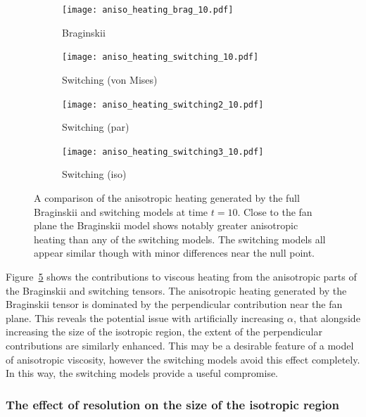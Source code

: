 \begin{figure}[t]
    \hfill
    \begin{subfigure}{0.49\textwidth}
      \texttt{[image: aniso\_heating\_brag\_10.pdf]}
      \caption{Braginskii}%
      \label{fig:aniso_heating_brag_10}
    \end{subfigure}
    \hfill
    \begin{subfigure}{0.49\textwidth}
      \texttt{[image: aniso\_heating\_switching\_10.pdf]}
      \caption{Switching (von Mises)}%
      \label{fig:aniso_heating_switching_10}
    \end{subfigure}
    \hfill
    \begin{subfigure}{0.49\textwidth}
      \texttt{[image: aniso\_heating\_switching2\_10.pdf]}
      \caption{Switching (par)}%
      \label{fig:aniso_heating_switching2_10}
    \end{subfigure}
    \hfill
    \begin{subfigure}{0.49\textwidth}
      \texttt{[image: aniso\_heating\_switching3\_10.pdf]}
      \caption{Switching (iso)}%
      \label{fig:aniso_heating_switching3_10}
    \end{subfigure}
    \caption{A comparison of the anisotropic heating generated by the full Braginskii and switching models at time $t=10$. Close to the fan plane the Braginskii model shows notably greater anisotropic heating than any of the switching models. The switching models all appear similar though with minor differences near the null point.}
\label{fig:anisotropic_heating}%
\end{figure}

Figure~\ref{fig:anisotropic_heating} shows the contributions to viscous heating from the anisotropic parts of the Braginskii and switching tensors. The anisotropic heating generated by the Braginskii tensor is dominated by the perpendicular contribution near the fan plane. This reveals the potential issue with artificially increasing $\alpha$, that alongside increasing the size of the isotropic region, the extent of the perpendicular contributions are similarly enhanced. This may be a desirable feature of a model of anisotropic viscosity, however the switching models avoid this effect completely. In this way, the switching models provide a useful compromise.

\subsubsection{The effect of resolution on the size of the isotropic region}

